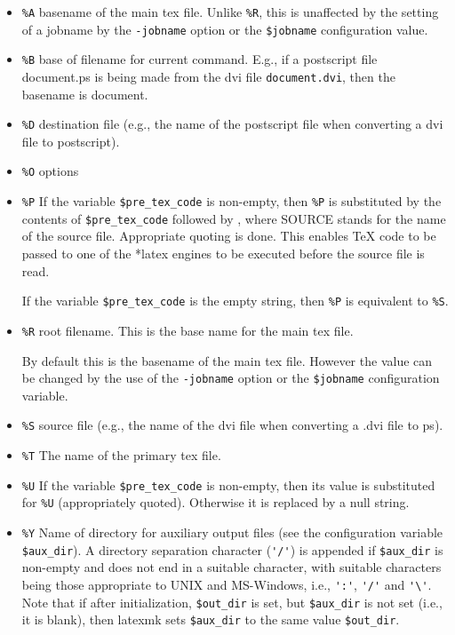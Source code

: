 \begin{itemize}

\item \verb|%A| basename of the main tex file.  Unlike \verb|%R|, this is
        unaffected by the setting of a jobname by  the \verb|-jobname| option or the
        \verb|$jobname| configuration value.

\item \verb|%B| base of filename for current command. E.g.,  if  a  postscript
file  document.ps  is being made from the dvi file \verb|document.dvi|,
then the basename is document.

\item \verb|%D| destination file (e.g., the name of  the  postscript  file  when
converting a dvi file to postscript).

\item \verb|%O| options

\item \verb|%P| If  the  variable \verb|$pre_tex_code| is non-empty, then
        \verb|%P| is substituted  by  the  contents  of  \verb|$pre_tex_code|
        followed  by   \verb||,  where  SOURCE  stands  for  the
        name of the source file.  Appropriate quoting is done.  This enables
        TeX code to be passed  to  one  of the *latex engines to be executed
        before the source file is read.

If the variable \verb|$pre_tex_code| is the empty string,  then  \verb|%P|  is
equivalent to \verb|%S|.

\item \verb|%R| root filename.  This is the base name for the main tex
        file.

By  default  this is the basename of the main tex file.  However the value can
be changed by the use of the  \verb|-jobname|  option  or the \verb|$jobname|
configuration variable.

\item \verb|%S|     source  file  (e.g.,  the name of the dvi file when converting a
.dvi file to ps).

\item \verb|%T|     The name of the primary tex file.

\item \verb|%U|     If the variable \verb|$pre_tex_code| is non-empty, then
        its  value  is substituted  for \verb|%U| (appropriately quoted).
        Otherwise it is replaced by a null string.

\item \verb|%Y|     Name of directory for auxiliary output files (see the
  configuration variable \verb|$aux_dir|).  A directory separation
  character (\verb|'/'|) is appended if \verb|$aux_dir| is
  non-empty and does not end in a suitable character, with
  suitable characters being those appropriate to UNIX and
  MS-Windows, i.e., \verb|':'|, \verb|'/'| and \verb|'\'|.   Note  that  if after
  initialization,  \verb|$out_dir| is set, but \verb|$aux_dir| is
  not set (i.e., it is blank), then latexmk  sets
  \verb|$aux_dir|  to  the  same value \verb|$out_dir|.


\end{itemize}
